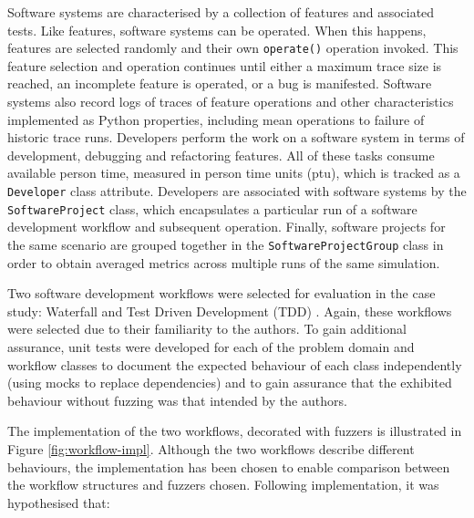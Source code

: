 \documentclass{sig-alternate}
\begin{document}
Software systems are characterised by a collection of features and associated
tests.  Like features, software systems can be operated.  When this happens,
features are selected randomly and their own \lstinline!operate()!  operation
invoked.  This feature selection and operation continues until either a maximum
trace size is reached, an incomplete feature is operated, or a bug is
manifested.  Software systems also record logs of traces of feature operations
and other characteristics implemented as Python properties, including mean
operations to failure of historic trace runs.  Developers perform the work on a
software system in terms of development, debugging and refactoring features.
All of these tasks consume available person time, measured in person time units
(ptu), which is tracked as a \lstinline!Developer! class attribute.  Developers
are associated with software systems by the \lstinline!SoftwareProject! class,
which encapsulates a particular run of a software development workflow and
subsequent operation.  Finally, software projects for the same scenario are
grouped together in the \lstinline!SoftwareProjectGroup! class in order to
obtain averaged metrics across multiple runs of the same simulation.

Two software development workflows were selected for evaluation in the case
study: Waterfall \citep{benington83production} and Test Driven Development (TDD)
\citep{beck02test}.  Again, these workflows were selected due to their
familiarity to the authors.  To gain additional assurance, unit tests were
developed for each of the problem domain and workflow classes to document the
expected behaviour of each class independently (using mocks to replace
dependencies) and to gain assurance that the exhibited behaviour without fuzzing
was that intended by the authors.

The implementation of the two workflows, decorated with fuzzers is illustrated
in Figure \ref{fig:workflow-impl}.  Although the two workflows describe
different behaviours, the implementation has been chosen to enable comparison
between the workflow structures and fuzzers chosen.  Following implementation,
it was hypothesised that:
\end{document}
